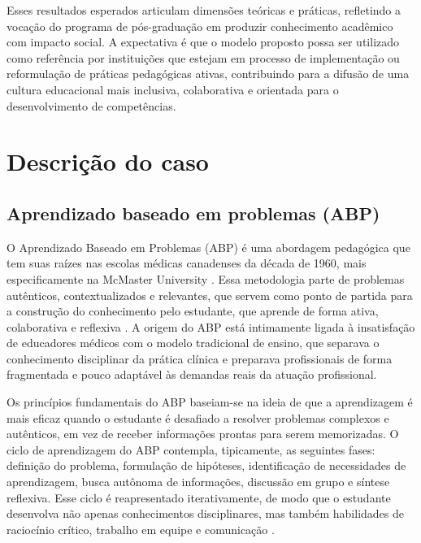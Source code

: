 Esses resultados esperados articulam dimensões teóricas e práticas, refletindo a vocação do programa de pós-graduação em produzir conhecimento acadêmico com impacto social. A expectativa é que o modelo proposto possa ser utilizado como referência por instituições que estejam em processo de implementação ou reformulação de práticas pedagógicas ativas, contribuindo para a difusão de uma cultura educacional mais inclusiva, colaborativa e orientada para o desenvolvimento de competências.


\section{Descrição do caso}
\label{sec:descricao_caso}

\subsection{Aprendizado baseado em problemas (ABP)}
\label{subsec:abp_descricao}

O Aprendizado Baseado em Problemas (ABP) é uma abordagem pedagógica que tem suas raízes nas escolas médicas canadenses da década de 1960, mais especificamente na McMaster University \cite{BARROWS1996}. Essa metodologia parte de problemas autênticos, contextualizados e relevantes, que servem como ponto de partida para a construção do conhecimento pelo estudante, que aprende de forma ativa, colaborativa e reflexiva \cite{SCHMIDT2001}. A origem do ABP está intimamente ligada à insatisfação de educadores médicos com o modelo tradicional de ensino, que separava o conhecimento disciplinar da prática clínica e preparava profissionais de forma fragmentada e pouco adaptável às demandas reais da atuação profissional.

Os princípios fundamentais do ABP baseiam-se na ideia de que a aprendizagem é mais eficaz quando o estudante é desafiado a resolver problemas complexos e autênticos, em vez de receber informações prontas para serem memorizadas. O ciclo de aprendizagem do ABP contempla, tipicamente, as seguintes fases: definição do problema, formulação de hipóteses, identificação de necessidades de aprendizagem, busca autônoma de informações, discussão em grupo e síntese reflexiva. Esse ciclo é reapresentado iterativamente, de modo que o estudante desenvolva não apenas conhecimentos disciplinares, mas também habilidades de raciocínio crítico, trabalho em equipe e comunicação \cite{BARROWS1996}.

